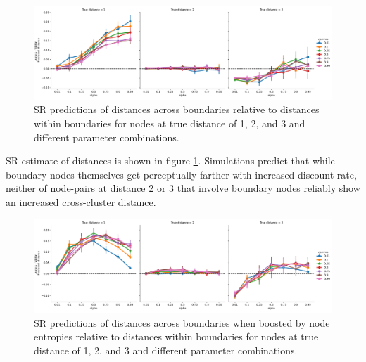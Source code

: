 \begin{figure}
    \centering
    \label{fig:SR-distance-estimate}
    \includegraphics[width = \textwidth]{chapter_notebooks/chapter_3/figures/distance_predictions.png}
    \caption{SR predictions of distances across boundaries relative to distances within boundaries for nodes at true distance of 1, 2, and 3 and different parameter combinations.}
\end{figure}

SR estimate of distances is shown in figure \ref{fig:SR-distance-estimate}. Simulations predict that while boundary nodes themselves get perceptually farther with increased discount rate, neither of node-pairs at distance 2 or 3 that involve boundary nodes reliably show an increased cross-cluster distance.

\begin{figure}
    \centering
    \label{fig:SR-distance-estimate-entropy-boost}
    \includegraphics[width = \textwidth]{chapter_notebooks/chapter_3/figures/distance_predictions_entropyboost.png}
    \caption{SR predictions of distances across boundaries when boosted by node entropies relative to distances within boundaries for nodes at true distance of 1, 2, and 3 and different parameter combinations.}
\end{figure}


